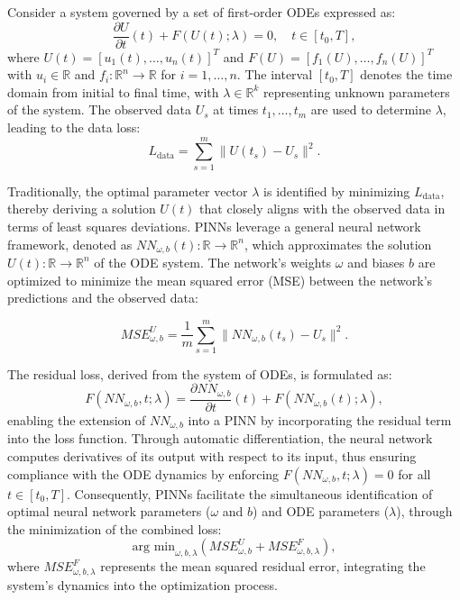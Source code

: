 \documentclass[12pt]{article}
\begin{document}
Consider a system governed by a set of first-order ODEs expressed as:
\begin{equation}
\frac{\partial U}{\partial t}(t) + F(U(t); \lambda) = 0, \quad t \in [t_0, T],
\end{equation}
where $U(t) = [u_1(t), \ldots, u_n(t)]^T$ and $F(U) = [f_1(U), \ldots, f_n(U)]^T$ with $u_i \in \mathbb{R}$ and $f_i: \mathbb{R}^n \rightarrow \mathbb{R}$ for $i = 1, \ldots, n$. The interval $[t_0, T]$ denotes the time domain from initial to final time, with $\lambda \in \mathbb{R}^k$ representing unknown parameters of the system. The observed data $U_s$ at times $t_1, \ldots, t_m$ are used to determine $\lambda$, leading to the data loss:
\begin{equation}
L_{\text{data}} = \sum_{s=1}^{m} \|U(t_s) - U_s\|^2.
\end{equation}

Traditionally, the optimal parameter vector $\lambda$ is identified by minimizing $L_{\text{data}}$, thereby deriving a solution $U(t)$ that closely aligns with the observed data in terms of least squares deviations. PINNs leverage a general neural network framework, denoted as $NN_{\omega,b}(t): \mathbb{R} \rightarrow \mathbb{R}^n$, which approximates the solution $U(t): \mathbb{R} \rightarrow \mathbb{R}^n$ of the ODE system. The network's weights $\omega$ and biases $b$ are optimized to minimize the mean squared error (MSE) between the network's predictions and the observed data:

\begin{equation}[h]
    MSE_{\omega,b}^U = \frac{1}{m} \sum_{s=1}^{m} \|NN_{\omega,b}(t_s) - U_s\|^2.
\end{equation}

The residual loss, derived from the system of ODEs, is formulated as:
\begin{equation}
F(NN_{\omega,b}, t; \lambda) = \frac{\partial NN_{\omega,b}}{\partial t}(t) + F(NN_{\omega,b}(t); \lambda),
\end{equation}
enabling the extension of $NN_{\omega,b}$ into a PINN by incorporating the residual term into the loss function. Through automatic differentiation, the neural network computes derivatives of its output with respect to its input, thus ensuring compliance with the ODE dynamics by enforcing $F(NN_{\omega,b}, t; \lambda) = 0$ for all $t \in [t_0, T]$. Consequently, PINNs facilitate the simultaneous identification of optimal neural network parameters ($\omega$ and $b$) and ODE parameters ($\lambda$), through the minimization of the combined loss:
\begin{equation}
\text{arg min}_{\omega, b, \lambda} \left( MSE_{\omega,b}^U + MSE_{\omega,b,\lambda}^F \right),
\end{equation}
where $MSE_{\omega,b,\lambda}^F$ represents the mean squared residual error, integrating the system's dynamics into the optimization process.
\end{document}
